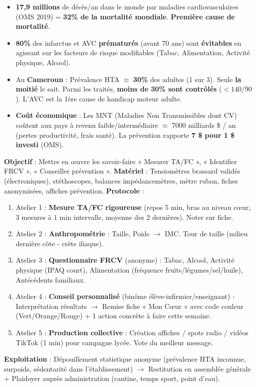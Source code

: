 \documentclass[11pt]{article}
\begin{document}
\begin{savaistu}
\begin{itemize}
    \item \textbf{17,9 millions} de décès/an dans le monde par maladies cardiovasculaires (OMS 2019) = \textbf{32\% de la mortalité mondiale}. \textbf{Première cause de mortalité}.
    \item \textbf{80\%} des infarctus et AVC \textbf{prématurés} (avant 70 ans) sont \textbf{évitables} en agissant sur les facteurs de risque modifiables (Tabac, Alimentation, Activité physique, Alcool).
    \item Au \textbf{Cameroun} : Prévalence HTA $\approx$ \textbf{30\%} des adultes (1 sur 3). Seule \textbf{la moitié} le sait. Parmi les traités, \textbf{moins de 30\% sont contrôlés} ($< 140/90$). L'AVC est la 1ère cause de handicap moteur adulte.
    \item \textbf{Coût économique} : Les MNT (Maladies Non Transmissibles dont CV) coûtent aux pays à revenu faible/intermédiaire $\approx$ 7000 milliards \$ / an (pertes productivité, frais santé). La prévention rapporte \textbf{7 \$ pour 1 \$ investi} (OMS).
\end{itemize}
\end{savaistu}

\begin{experience}
\textbf{Objectif} : Mettre en œuvre les savoir-faire « Mesurer TA/FC », « Identifier FRCV », « Conseiller prévention ».
\textbf{Matériel} : Tensiomètres brassard validés (électroniques), stéthoscopes, balances impédancemètres, mètre ruban, fiches anonymisées, affiches prévention.
\textbf{Protocole} :
\begin{enumerate}
    \item Atelier 1 : \textbf{Mesure TA/FC rigoureuse} (repos 5 min, bras au niveau cœur, 3 mesures à 1 min intervalle, moyenne des 2 dernières). Noter sur fiche.
    \item Atelier 2 : \textbf{Anthropométrie} : Taille, Poids $\rightarrow$ IMC. Tour de taille (milieu dernière côte - crête iliaque).
    \item Atelier 3 : \textbf{Questionnaire FRCV} (anonyme) : Tabac, Alcool, Activité physique (IPAQ court), Alimentation (fréquence fruits/légumes/sel/huile), Antécédents familiaux.
    \item Atelier 4 : \textbf{Conseil personnalisé} (binôme élève-infirmier/enseignant) : Interprétation résultats $\rightarrow$ Remise fiche « Mon Cœur » avec code couleur (Vert/Orange/Rouge) + 1 action concrète à faire cette semaine.
    \item Atelier 5 : \textbf{Production collective} : Création affiches / spots radio / vidéos TikTok (1 min) pour campagne lycée. Vote du meilleur message.
\end{enumerate}
\textbf{Exploitation} : Dépouillement statistique anonyme (prévalence HTA inconnue, surpoids, sédentarité dans l'établissement) $\rightarrow$ Restitution en assemblée générale + Plaidoyer auprès administration (cantine, temps sport, point d'eau).
\end{experience}
\end{document}
